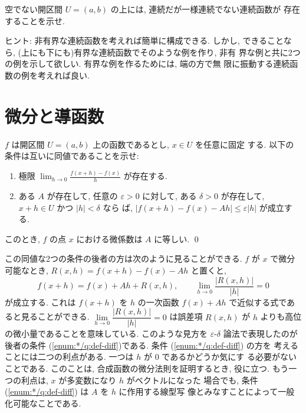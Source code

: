 \documentclass[12pt,twoside]{jarticle}
\begin{document}
\begin{question}
  空でない開区間 $U=(a,b)$ の上には, 連続だが一様連続でない連続函数が
  存在することを示せ.
\end{question}

\noindent ヒント: 非有界な連続函数を考えれば簡単に構成できる. しかし, 
できることなら, (上にも下にも)有界な連続函数でそのような例を作り, 非有
界な例と共に2つの例を示して欲しい. 有界な例を作るためには, 端の方で無
限に振動する連続函数の例を考えれば良い.


\section{微分と導函数}

\begin{question}
  $f$ は開区間 $U=(a,b)$ 上の函数であるとし, $x\in U$ を任意に固定
  する. 以下の条件は互いに同値であることを示せ:
  \begin{enumerate}
  \item 極限 $\displaystyle\lim_{h\to0}\frac{f(x+h)-f(x)}{h}$ %
    が存在する.
  \item ある $A$ が存在して, 任意の $\varepsilon > 0$ に対して,
    ある $\delta > 0$ が存在して, $x + h \in U$ かつ $|h|<\delta$ なら
    ば, $|f(x+h) - f(x) - A h| \le \varepsilon |h|$ が成立する.
    \label{enum:*/q:def-diff}
  \end{enumerate}
  このとき, $f$ の点 $x$ における微係数は $A$ に等しい.
  \qed
\end{question}

\noindent この同値な2つの条件の後者の方は次のように見ることができる. 
$f$ が $x$ で微分可能なとき, 
$R(x,h) = f(x + h) - f(x) - A h$ と置くと, 
\[
  f(x + h) = f(x) + Ah + R(x,h),
  \qquad
  \lim_{h\to 0}\frac{|R(x,h)|}{|h|} = 0
\]%
が成立する. %
これは $f(x + h)$ を $h$ の一次函数 $f(x) + Ah$ で近似する式であ
ると見ることができる. $\lim\limits_{h\to 0}\dfrac{|R(x,h)|}{|h|} = 0$ %
は誤差項 $R(x,h)$ が $h$ よりも高位の微小量であることを意味している. 
このような見方を $\varepsilon$-$\delta$ 論法で表現したのが後者の条件
(\ref{enum:*/q:def-diff})である. 条件 (\ref{enum:*/q:def-diff}) の方を
考えることには二つの利点がある. 一つは $h$ が $0$ であるかどうか気にす
る必要がないことである. このことは, 合成函数の微分法則を証明するとき, 
役に立つ. もう一つの利点は, $x$ が多変数になり $h$ がベクトルになった
場合でも, 条件(\ref{enum:*/q:def-diff}) は $A$ を $h$ に作用する線型写
像とみなすことによって一般化可能なことである.
\end{document}
